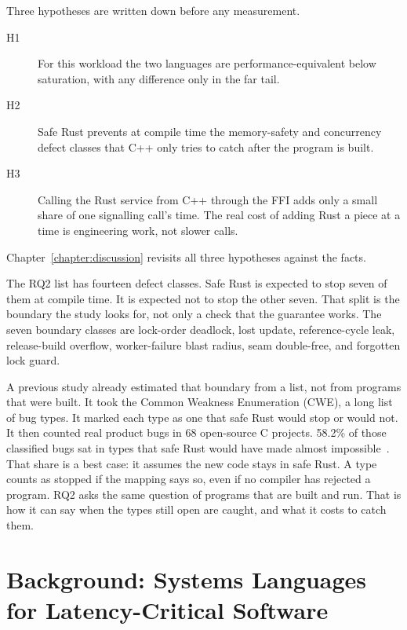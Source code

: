 \documentclass[english,oneside,a4paper,censored,csm,software-track-2020]{HYthesisML}
\begin{document}
Three hypotheses are written down before any measurement.
\begin{description}
  \item[H1] For this workload the two languages are performance-equivalent below
        saturation, with any difference only in the far tail.
  \item[H2] Safe Rust prevents at compile time the memory-safety and concurrency defect
        classes that C++ only tries to catch after the program is built.
  \item[H3] Calling the Rust service from C++ through the FFI adds only a small
        share of one signalling call's time. The real cost of adding Rust a
        piece at a time is engineering work, not slower calls.
\end{description}
Chapter~\ref{chapter:discussion} revisits all three hypotheses against the facts.

The RQ2 list has fourteen defect classes. Safe Rust is expected to stop seven of
them at compile time. It is expected not to stop the other seven. That split is
the boundary the study looks for, not only a check that the guarantee works. The seven
boundary classes are lock-order deadlock, lost update, reference-cycle leak,
release-build overflow, worker-failure blast radius, seam double-free, and
forgotten lock guard.

A previous study already estimated that boundary from a list, not from
programs that were built.
It took the Common Weakness Enumeration (CWE), a long list of bug
types.
It marked each type as one that safe Rust would stop or would not.
It then counted real product bugs in 68 open-source C projects.
58.2\% of those classified bugs sat in types that safe Rust would have
made almost impossible~\cite{meneely2025justuserust}.
That share is a best case: it assumes the new code stays in safe Rust.
A type counts as stopped if the mapping says so, even if no compiler
has rejected a program.
RQ2 asks the same question of programs that are built and run.
That is how it can say when the types still open are caught, and what
it costs to catch them.

\chapter{Background: Systems Languages for Latency-Critical Software\label{chapter:background}}
\end{document}

